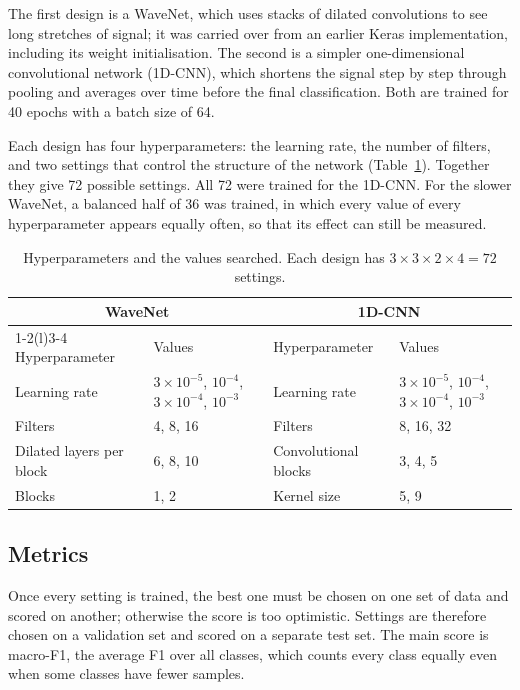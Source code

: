 \documentclass[11pt,a4paper]{article}
\newcommand{\sci}[2]{#1\times10^{#2}}
\begin{document}
The first design is a WaveNet, which uses stacks of dilated convolutions to see long stretches of signal; it was carried over from an earlier Keras implementation, including its weight initialisation. The second is a simpler one-dimensional convolutional network (1D-CNN), which shortens the signal step by step through pooling and averages over time before the final classification. Both are trained for 40 epochs with a batch size of 64.

Each design has four hyperparameters: the learning rate, the number of filters, and two settings that control the structure of the network (Table~\ref{tab:space}). Together they give 72 possible settings. All 72 were trained for the 1D-CNN. For the slower WaveNet, a balanced half of 36 was trained, in which every value of every hyperparameter appears equally often, so that its effect can still be measured.

\begin{table}[htbp]
  \centering
  \caption{Hyperparameters and the values searched. Each design has $3\times3\times2\times4=72$ settings.}
  \label{tab:space}
  \small
  \begin{tabularx}{\textwidth}{@{}l X l X@{}}
    \toprule
    \multicolumn{2}{c}{WaveNet} & \multicolumn{2}{c}{1D-CNN} \\
    \cmidrule(r){1-2}\cmidrule(l){3-4}
    Hyperparameter & Values & Hyperparameter & Values \\
    \midrule
    Learning rate & $\sci{3}{-5}$, $10^{-4}$, $\sci{3}{-4}$, $10^{-3}$ & Learning rate & $\sci{3}{-5}$, $10^{-4}$, $\sci{3}{-4}$, $10^{-3}$ \\
    Filters & 4, 8, 16 & Filters & 8, 16, 32 \\
    Dilated layers per block & 6, 8, 10 & Convolutional blocks & 3, 4, 5 \\
    Blocks & 1, 2 & Kernel size & 5, 9 \\
    \bottomrule
  \end{tabularx}
\end{table}

\subsection{Metrics}\label{sec:metrics}

Once every setting is trained, the best one must be chosen on one set of data and scored on another; otherwise the score is too optimistic. Settings are therefore chosen on a validation set and scored on a separate test set. The main score is macro-F1, the average F1 over all classes, which counts every class equally even when some classes have fewer samples.
\end{document}
